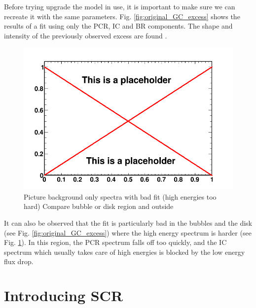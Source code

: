 Before trying upgrade the model in use, it is important to make sure we can recreate it with the same parameters. Fig. \ref{fig:original_GC_excess} shows the results of a fit using only the PCR, IC and BR components. The shape and intensity of the previously observed excess are found .\\

\begin{figure}[h]
  \centering
  \includegraphics[width=.9\linewidth]{pic/dummy.png}
  \caption{Picture background only spectra with bad fit (high energies too hard) Compare bubble or disk region and outside}
  \label{fig:bkgd_only_spectrum}
\end{figure}

It can also be observed that the fit is particularly bad in the bubbles and the disk (see Fig. \ref{fig:original_GC_excess}) where the high energy spectrum is harder (see Fig. \ref{fig:bkgd_only_spectrum}). In this region, the PCR spectrum falls off too quickly, and the IC spectrum which usually takes care of high energies is blocked by the low energy flux drop.




\section{Introducing SCR}

